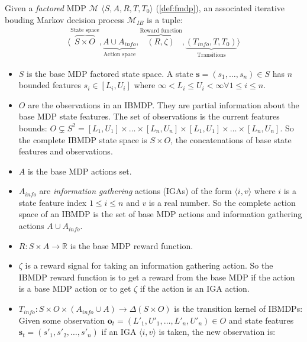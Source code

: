 \begin{definition}\label{def:ibmdp}
Given a \textit{factored} MDP $\mathcal{M}$ $\langle S, A, R, T, T_0 \rangle$ (\ref{def:fmdp}), an associated iterative bouding Markov decision process $\mathcal{M}_{IB}$ is a tuple:
\begin{align*}
    \langle \overbrace{S \times O}^{\text{State space}}, \underbrace{A \cup A_{info}}_{\text{Action space}}, \overbrace{(R, \zeta)}^{\text{Reward function}}, \underbrace{(T_{info}, T, T_0)}_{\text{Transitions}}\rangle
\end{align*}

\begin{itemize}
\item $S$ is the base MDP factored state space. A state $\boldsymbol{s} = (s_1, \dots, s_n)\in S$ has $n$ bounded features $s_i \in [L_i, U_i]$ where $\infty < L_i \leq U_i < \infty \forall 1\leq i \leq n$.
\item $O$ are the observations in an IBMDP. They are partial information about the base MDP state features. The set of observations is the current features bounds: $O\subsetneq S^2 =  [L_1, U_1]\times \dots \times [L_n, U_n] \times [L_1, U_1]\times \dots \times [L_n, U_n]$. So the complete IBMDP state space is $S \times O$, the concatenations of base state features and observations.
\item $A$ is the base MDP actions set.
\item $A_{info}$ are \textit{information gathering} actions (IGAs) of the form $\langle i, v \rangle$ where $i$ is a state feature index $1 \leq i \leq n$ and $v$ is a real number. So the complete action space of an IBMDP is the set of base MDP actions and information gathering actions $A \cup A_{info}$.
\item $R: S\times A \rightarrow \mathbb{R}$ is the base MDP reward function.
\item $\zeta$ is a reward signal for taking an information gathering action.
So the IBMDP reward function is to get a reward from the base MDP if the action is a base MDP action or to get $\zeta$ if the action is an IGA action.
\item $T_{info}: S\times O \times( A_{info} \cup A )\rightarrow \Delta (S\times O)$ is the transition kernel of IBMDPs: 
Given some observation $\boldsymbol{o}_t = (L'_1, U'_1, \dots, L'_n, U'_n) \in O$ and state features $\boldsymbol{s}_t=(s'_1, s'_2, \dots, s'_n)$ if an IGA $\langle i, v \rangle$ is taken, the new observation is:
\begin{align*}

\end{align*}
\end{itemize}
\end{definition}
